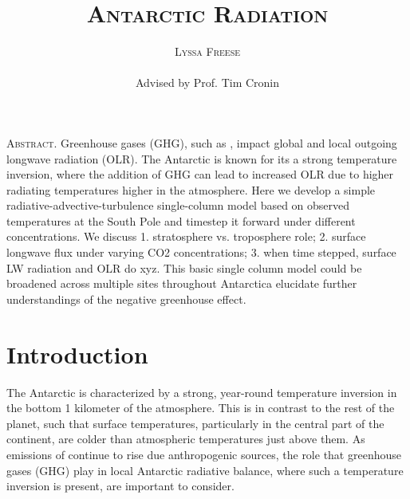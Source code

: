 \documentclass[12]{article}
\title{{\textsc{\Large Antarctic Radiation}}}
\author{\textsc{Lyssa Freese}
\\\\
Advised by Prof. Tim Cronin}
\begin{document}
\maketitle
\thispagestyle{empty}

\setlength{\leftskip}{1.1cm}
\setlength{\rightskip}{1.1cm}


\bigskip
\bigskip

{\textsc{Abstract.} }
Greenhouse gases (GHG), such as , impact global and local outgoing longwave radiation (OLR). The Antarctic is known for its a strong temperature inversion, where the addition of GHG can lead to increased OLR due to higher radiating temperatures higher in the atmosphere. Here we develop a simple radiative-advective-turbulence single-column model based on observed temperatures at the South Pole and timestep it forward under different  concentrations. We discuss 1. stratosphere vs. troposphere role; 2. surface longwave flux under varying CO2 concentrations; 3. when time stepped, surface LW radiation and OLR do xyz. This basic single column model could be broadened across multiple sites throughout Antarctica elucidate further understandings of the negative greenhouse effect.
\bigskip
\bigskip 
\clearpage
\setcounter{page}{1}

\setlength{\leftskip}{0cm}
\setlength{\rightskip}{0cm}

\section{Introduction}
The Antarctic is characterized by a strong, year-round temperature inversion in the bottom 1 kilometer of the atmosphere. This is in contrast to the rest of the planet, such that surface temperatures, particularly in the central part of the continent, are colder than atmospheric temperatures just above them\citep{hudson_look_2005}. As emissions of  continue to rise due anthropogenic sources, the role that greenhouse gases (GHG) play in local Antarctic radiative balance, where such a temperature inversion is present, are important to consider.
\end{document}
